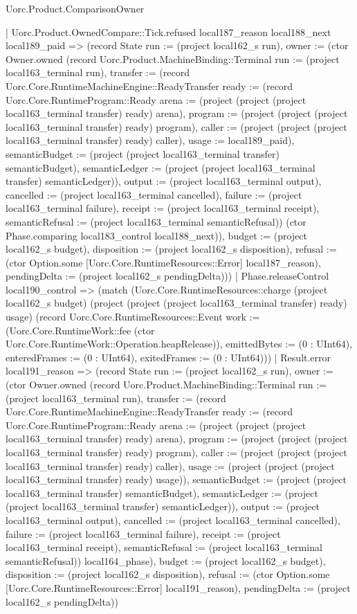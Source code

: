\begin{lexlean}{Uorc.Product.ComparisonOwner}
\begin{semanticmodule}
{      | Uorc.Product.OwnedCompare::Tick.refused local187_reason local188_next local189_paid => (record State {run := (project local162_s run), owner := (ctor Owner.owned (record Uorc.Product.MachineBinding::Terminal {run := (project local163_terminal run), transfer := (record Uorc.Core.RuntimeMachineEngine::ReadyTransfer {ready := (record Uorc.Core.RuntimeProgram::Ready {arena := (project (project (project local163_terminal transfer) ready) arena), program := (project (project (project local163_terminal transfer) ready) program), caller := (project (project (project local163_terminal transfer) ready) caller), usage := local189_paid}), semanticBudget := (project (project local163_terminal transfer) semanticBudget), semanticLedger := (project (project local163_terminal transfer) semanticLedger)}), output := (project local163_terminal output), cancelled := (project local163_terminal cancelled), failure := (project local163_terminal failure), receipt := (project local163_terminal receipt), semanticRefusal := (project local163_terminal semanticRefusal)}) (ctor Phase.comparing local183_control local188_next)), budget := (project local162_s budget), disposition := (project local162_s disposition), refusal := (ctor Option.some [Uorc.Core.RuntimeResources::Error] local187_reason), pendingDelta := (project local162_s pendingDelta)}))
    | Phase.releaseControl local190_control => (match (Uorc.Core.RuntimeResources::charge (project local162_s budget) (project (project (project local163_terminal transfer) ready) usage) (record Uorc.Core.RuntimeResources::Event {work := (Uorc.Core.RuntimeWork::fee (ctor Uorc.Core.RuntimeWork::Operation.heapRelease)), emittedBytes := (0 : UInt64), enteredFrames := (0 : UInt64), exitedFrames := (0 : UInt64)}))
      | Result.error local191_reason => (record State {run := (project local162_s run), owner := (ctor Owner.owned (record Uorc.Product.MachineBinding::Terminal {run := (project local163_terminal run), transfer := (record Uorc.Core.RuntimeMachineEngine::ReadyTransfer {ready := (record Uorc.Core.RuntimeProgram::Ready {arena := (project (project (project local163_terminal transfer) ready) arena), program := (project (project (project local163_terminal transfer) ready) program), caller := (project (project (project local163_terminal transfer) ready) caller), usage := (project (project (project local163_terminal transfer) ready) usage)}), semanticBudget := (project (project local163_terminal transfer) semanticBudget), semanticLedger := (project (project local163_terminal transfer) semanticLedger)}), output := (project local163_terminal output), cancelled := (project local163_terminal cancelled), failure := (project local163_terminal failure), receipt := (project local163_terminal receipt), semanticRefusal := (project local163_terminal semanticRefusal)}) local164_phase), budget := (project local162_s budget), disposition := (project local162_s disposition), refusal := (ctor Option.some [Uorc.Core.RuntimeResources::Error] local191_reason), pendingDelta := (project local162_s pendingDelta)})
}
\end{semanticmodule}
\end{lexlean}
